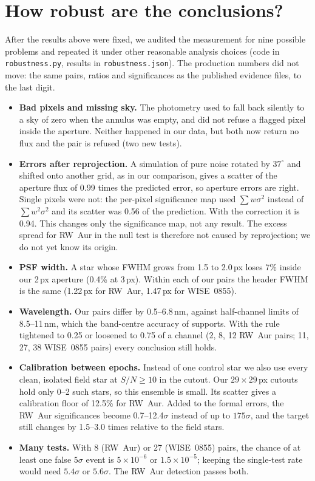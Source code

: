 \documentclass[11pt,a4paper]{article}
\begin{document}
\section{How robust are the conclusions?}\label{sec:rob}
After the results above were fixed, we audited the measurement for nine possible problems and repeated it under
other reasonable analysis choices (code in \texttt{robustness.py}, results in
\texttt{robustness.json}). The production numbers did not move: the same pairs, ratios and significances as the
published evidence files, to the last digit.
\begin{itemize}\setlength\itemsep{1pt}
\item \textbf{Bad pixels and missing sky.} The photometry used to fall back silently to a sky of zero when the annulus
was empty, and did not refuse a flagged pixel inside the aperture. Neither happened in our data, but both now return
no flux and the pair is refused (two new tests).
\item \textbf{Errors after reprojection.} A simulation of pure noise rotated by $37^\circ$ and shifted onto another
grid, as in our comparison, gives a scatter of the aperture flux of 0.99 times the predicted error, so aperture
errors are right. Single pixels were not: the per-pixel significance map used $\sum w\sigma^2$ instead of
$\sum w^2\sigma^2$ and its scatter was 0.56 of the prediction. With the correction it is 0.94. This changes only the
significance map, not any result. The excess spread for RW~Aur in the null test is therefore not caused by
reprojection; we do not yet know its origin.
\item \textbf{PSF width.} A star whose FWHM grows from 1.5 to 2.0\,px loses 7\% inside our 2\,px aperture (0.4\% at
3\,px). Within each of our pairs the header FWHM is the same (1.22\,px for RW~Aur, 1.47\,px for WISE~0855).
\item \textbf{Wavelength.} Our pairs differ by 0.5--6.8\,nm, against half-channel limits of 8.5--11\,nm, which the
band-centre accuracy of \textcite{hui2026} supports. With the rule tightened to 0.25 or loosened to 0.75 of a channel
(2, 8, 12 RW~Aur pairs; 11, 27, 38 WISE~0855 pairs) every conclusion still holds.
\item \textbf{Calibration between epochs.} Instead of one control star we also use every clean, isolated field star at
$S/N\ge10$ in the cutout. Our $29\times29$\,px cutouts hold only 0--2 such stars, so this ensemble is small. Its scatter
gives a calibration floor of 12.5\% for RW~Aur. Added to the formal errors, the RW~Aur significances become 0.7--12.4$\sigma$
instead of up to $175\sigma$, and the target still changes by 1.5--3.0 times relative to the field stars.
\item \textbf{Many tests.} With 8 (RW~Aur) or 27 (WISE~0855) pairs, the chance of at least one false $5\sigma$ event
is $5\times10^{-6}$ or $1.5\times10^{-5}$; keeping the single-test rate would need $5.4\sigma$ or $5.6\sigma$.
The RW~Aur detection passes both.
\end{itemize}
\end{document}
